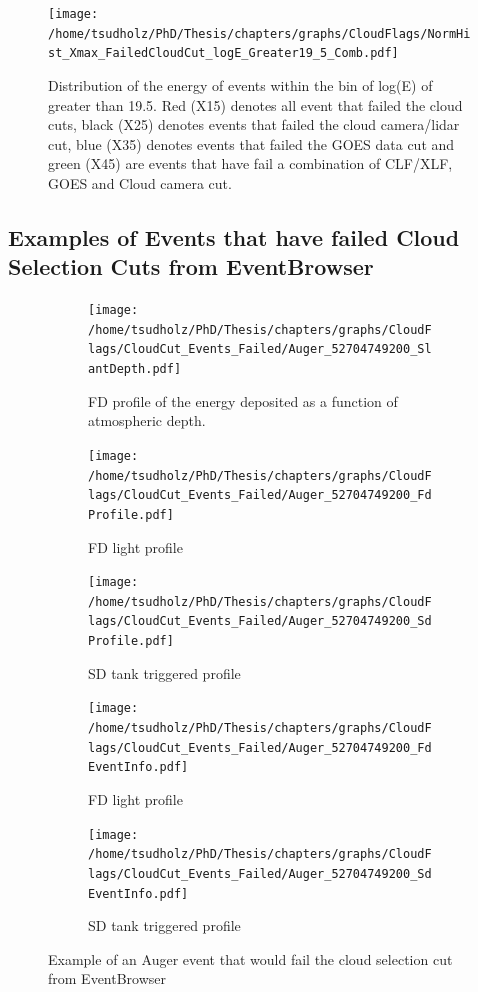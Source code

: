 \begin{figure}
\centering
\texttt{[image: /home/tsudholz/PhD/Thesis/chapters/graphs/CloudFlags/NormHist\_Xmax\_FailedCloudCut\_logE\_Greater19\_5\_Comb.pdf]}
\caption{Distribution of the energy of events within the bin of log(E) of greater than 19.5. Red (X15) denotes all event that failed the cloud cuts, black (X25) denotes events that failed the cloud camera/lidar cut, blue (X35) denotes events that failed the GOES data cut and green (X45) are events that have fail a combination of CLF/XLF, GOES and Cloud camera cut.}
\end{figure}

\subsection{Examples of Events that have failed Cloud Selection Cuts from EventBrowser}


\begin{figure}
\centering
 \vspace{2cm}
  \begin{subfigure}[b]{\textwidth}
  \centering
  \texttt{[image: /home/tsudholz/PhD/Thesis/chapters/graphs/CloudFlags/CloudCut\_Events\_Failed/Auger\_52704749200\_SlantDepth.pdf]}
  \caption{FD profile of the energy deposited as a function of atmospheric depth.}
  \end{subfigure}
 \vspace{0.5cm}
  \begin{subfigure}[b]{0.45\textwidth}
  	\centering
  	\texttt{[image: /home/tsudholz/PhD/Thesis/chapters/graphs/CloudFlags/CloudCut\_Events\_Failed/Auger\_52704749200\_FdProfile.pdf]}
  	\caption{FD light profile}
  \end{subfigure}
  \begin{subfigure}[b]{0.45\textwidth}
  	\centering
  	\texttt{[image: /home/tsudholz/PhD/Thesis/chapters/graphs/CloudFlags/CloudCut\_Events\_Failed/Auger\_52704749200\_SdProfile.pdf]}
  	\caption{SD tank triggered profile}
  \end{subfigure}

  \begin{subfigure}[b]{0.45\textwidth}
  	\centering
	\texttt{[image: /home/tsudholz/PhD/Thesis/chapters/graphs/CloudFlags/CloudCut\_Events\_Failed/Auger\_52704749200\_FdEventInfo.pdf]}
  	\caption{FD light profile}
  \end{subfigure}
  \begin{subfigure}[b]{0.45\textwidth}
  	\centering
	\texttt{[image: /home/tsudholz/PhD/Thesis/chapters/graphs/CloudFlags/CloudCut\_Events\_Failed/Auger\_52704749200\_SdEventInfo.pdf]}
  	\caption{SD tank triggered profile}
  \end{subfigure}
  \caption{Example of an Auger event that would fail the cloud selection cut from EventBrowser}
\end{figure}

